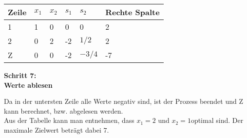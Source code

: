 \begin{table}[!h]
\begin{tabular}{|l|l|l|l|l|l|}
\hline
\rowcolor[HTML]{C0C0C0} 
Zeile                     & $x_1$ & $x_2$ & $s_1$ & $s_2$   & Rechte Spalte \\ \hline
\rowcolor[HTML]{FFFFFF} 
\cellcolor[HTML]{C0C0C0}1 & 1  & 0  & 0  & 0    & 2             \\ \hline
\rowcolor[HTML]{FFFFFF} 
\cellcolor[HTML]{C0C0C0}2 & 0  & 2  & -2 & $1/2$  & 2             \\ \hline
\rowcolor[HTML]{FFFFFF} 
\cellcolor[HTML]{C0C0C0}Z & 0  & 0  & -2 & $-3/4$ & -7            \\ \hline
\end{tabular}
\end{table}
\begin{center}\textbf{Schritt 7: \\Werte ablesen }\\\end{center}
Da in der untersten Zeile alle Werte negativ sind, ist der Prozess beendet und Z kann berechnet, bzw. abgelesen werden.\\
Aus der Tabelle kann man entnehmen, dass \(x_1=2\) und \( x_2=1 \)optimal sind. Der maximale Zielwert beträgt dabei 7. 